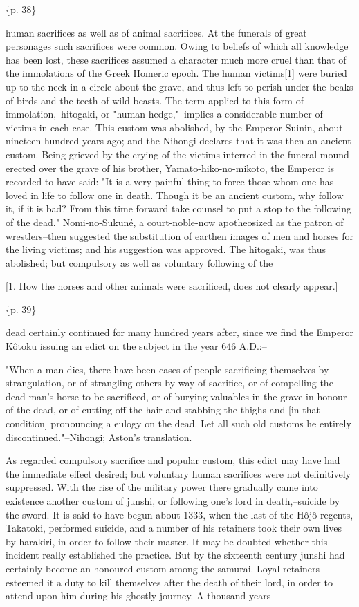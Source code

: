 \{p. 38\}

human sacrifices as well as of animal sacrifices. At the funerals of great personages such sacrifices were common. Owing to beliefs of which all knowledge has been lost, these sacrifices assumed a character much more cruel than that of the immolations of the Greek Homeric epoch. The human victims[1] were buried up to the neck in a circle about the grave, and thus left to perish under the beaks of birds and the teeth of wild beasts. The term applied to this form of immolation,--hitogaki, or "human hedge,"--implies a considerable number of victims in each case. This custom was abolished, by the Emperor Suinin, about nineteen hundred years ago; and the Nihongi declares that it was then an ancient custom. Being grieved by the crying of the victims interred in the funeral mound erected over the grave of his brother, Yamato-hiko-no-mikoto, the Emperor is recorded to have said: "It is a very painful thing to force those whom one has loved in life to follow one in death. Though it be an ancient custom, why follow it, if it is bad? From this time forward take counsel to put a stop to the following of the dead." Nomi-no-Sukuné, a court-noble-now apotheosized as the patron of wrestlers--then suggested the substitution of earthen images of men and horses for the living victims; and his suggestion was approved. The hitogaki, was thus abolished; but compulsory as well as voluntary following of the

[1. How the horses and other animals were sacrificed, does not clearly appear.]

\{p. 39\}

dead certainly continued for many hundred years after, since we find the Emperor Kôtoku issuing an edict on the subject in the year 646 A.D.:--

"When a man dies, there have been cases of people sacrificing themselves by strangulation, or of strangling others by way of sacrifice, or of compelling the dead man's horse to be sacrificed, or of burying valuables in the grave in honour of the dead, or of cutting off the hair and stabbing the thighs and [in that condition] pronouncing a eulogy on the dead. Let all such old customs he entirely discontinued."--Nihongi; Aston's translation.

As regarded compulsory sacrifice and popular custom, this edict may have had the immediate effect desired; but voluntary human sacrifices were not definitively suppressed. With the rise of the military power there gradually came into existence another custom of junshi, or following one's lord in death,--suicide by the sword. It is said to have begun about 1333, when the last of the Hôjô regents, Takatoki, performed suicide, and a number of his retainers took their own lives by harakiri, in order to follow their master. It may be doubted whether this incident really established the practice. But by the sixteenth century junshi had certainly become an honoured custom among the samurai. Loyal retainers esteemed it a duty to kill themselves after the death of their lord, in order to attend upon him during his ghostly journey. A thousand years

